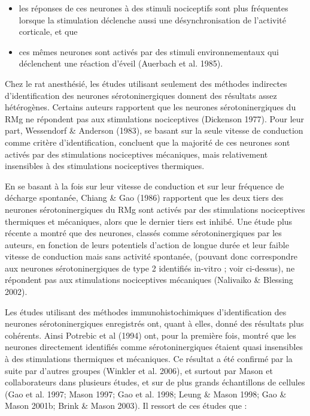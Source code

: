 \documentclass[a4paper,12pt,twoside]{report}
\begin{document}
\begin{itemize}
\item les réponses de ces neurones à des stimuli nociceptifs sont plus fréquentes lorsque la stimulation déclenche aussi une désynchronisation de l’activité corticale, et que
\item ces mêmes neurones sont activés par des stimuli environnementaux qui déclenchent une réaction d’éveil (Auerbach et al. 1985). 
\end{itemize}

Chez le rat anesthésié, les études utilisant seulement des méthodes indirectes d’identification des neurones sérotoninergiques donnent des résultats assez hétérogènes. Certains auteurs rapportent que les neurones sérotoninergiques du RMg ne répondent pas aux stimulations nociceptives (Dickenson 1977). Pour leur part, Wessendorf \& Anderson (1983), se basant sur la seule vitesse de conduction comme critère d’identification, concluent que la majorité de ces neurones sont activés par des stimulations nociceptives mécaniques, mais relativement insensibles à des stimulations nociceptives thermiques.

En se basant à la fois sur leur vitesse de conduction et sur leur fréquence de décharge spontanée, Chiang \& Gao (1986) rapportent que les deux tiers des neurones sérotoninergiques du RMg sont activés par des stimulations nociceptives thermiques et mécaniques, alors que le dernier tiers est inhibé. Une étude plus récente a montré que des neurones, classés comme sérotoninergiques par les auteurs, en fonction de leurs potentiels d’action de longue durée et leur faible vitesse de conduction mais sans activité spontanée, (pouvant donc correspondre aux neurones sérotoninergiques de type 2 identifiés in-vitro ; voir ci-dessus), ne répondent pas aux stimulations nociceptives mécaniques (Nalivaiko \& Blessing 2002).

Les études utilisant des méthodes immunohistochimiques d’identification des neurones sérotoninergiques enregistrés ont, quant à elles, donné des résultats plus cohérents. Ainsi Potrebic et al (1994) ont, pour la première fois, montré que les neurones directement identifiés comme sérotoninergiques étaient quasi insensibles à des stimulations thermiques et mécaniques. Ce résultat a été confirmé par la suite par d’autres groupes (Winkler et al. 2006), et surtout par Mason et collaborateurs dans plusieurs études, et sur de plus grands échantillons de cellules (Gao et al. 1997; Mason 1997; Gao et al. 1998; Leung \& Mason 1998; Gao \& Mason 2001b; Brink \& Mason 2003). Il ressort de ces études que :
\end{document}
